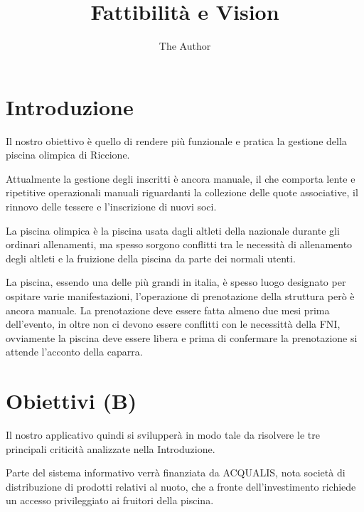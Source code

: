 \documentclass[11pt]{article} %
\title{Fattibilità e Vision}
\author{The Author}
\begin{document}
\maketitle

\section{Introduzione}

Il nostro obiettivo è quello di rendere più funzionale e pratica la gestione della piscina olimpica di Riccione.

Attualmente la gestione degli inscritti è ancora manuale, il che comporta lente e ripetitive operazionali manuali riguardanti la collezione delle quote associative, il rinnovo delle tessere e l'inscrizione di nuovi soci.

La piscina olimpica è la piscina usata dagli altleti della nazionale durante gli ordinari allenamenti, ma spesso sorgono conflitti tra le necessità di allenamento degli altleti e la fruizione della piscina da parte dei normali utenti.

La piscina, essendo una delle più grandi in italia, è spesso luogo designato per ospitare varie manifestazioni, l'operazione di prenotazione della struttura però è ancora manuale. 
La prenotazione deve essere fatta almeno due mesi prima dell'evento, in oltre non ci devono essere conflitti con le necessittà della FNI, ovviamente la piscina deve essere libera e prima di confermare la prenotazione si attende l'acconto della caparra.



\section{Obiettivi (B)}

Il nostro applicativo quindi si svilupperà in modo tale da risolvere le tre principali criticità analizzate nella Introduzione.

Parte del sistema informativo verrà finanziata da ACQUALIS, nota società di distribuzione di prodotti relativi al nuoto, che a fronte dell'investimento richiede un accesso privileggiato ai fruitori della piscina.
\end{document}
